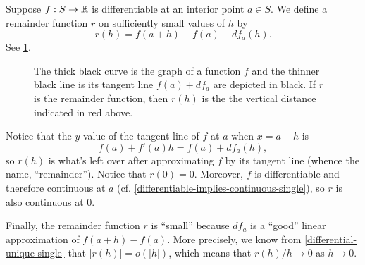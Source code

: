 \begin{remark} \label{remainder-linear}
	Suppose $f : S \to \mathbb{R}$ is differentiable at an interior point $a \in S$. We define a remainder function $r$ on sufficiently small values of $h$ by
	\[ r(h) = f(a+h) - f(a) - df_a(h). \]
	See \cref{figure-remainder-linear}. 
	\begin{figure}
		\begin{center}
		\end{center}
		\caption{The thick black curve is the graph of a function $f$ and the thinner black line is its tangent line $f(a) + df_a$ are depicted in black. If $r$ is the remainder function, then $r(h)$ is the the vertical distance indicated in red above.}  \label{figure-remainder-linear}
	\end{figure}

	Notice that the $y$-value of the tangent line of $f$ at $a$ when $x = a+h$ is \[ f(a) + f'(a)h = f(a) + df_a(h), \]
	so $r(h)$ is what's left over after approximating $f$ by its tangent line (whence the name, ``remainder''). Notice that $r(0) = 0$. Moreover, $f$ is differentiable and therefore continuous at $a$ (cf. \cref{differentiable-implies-continuous-single}), so $r$ is also  continuous at 0. 
	
	Finally, the remainder function $r$ is ``small'' because $df_a$ is a ``good'' linear approximation of $f(a+h)-f(a)$. More precisely, we know from \cref{differential-unique-single} that $|r(h)| = o(|h|)$, which means that $r(h)/h \to 0$ as $h \to 0$. 
\end{remark} 

